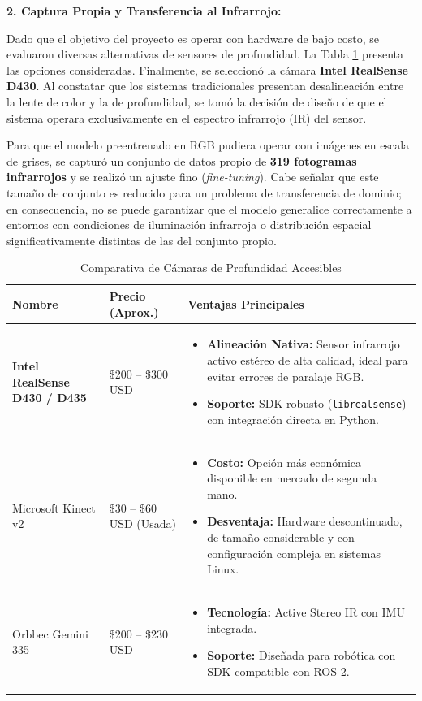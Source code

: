\documentclass[12pt, a4, twoside, openany]{report}
\begin{document}
\textbf{2. Captura Propia y Transferencia al Infrarrojo:}

Dado que el objetivo del proyecto es operar con hardware de bajo costo, se evaluaron diversas alternativas de sensores de profundidad. La Tabla \ref{tab:comparativa_camaras} presenta las opciones consideradas. Finalmente, se seleccionó la cámara \textbf{Intel RealSense D430}. Al constatar que los sistemas tradicionales presentan desalineación entre la lente de color y la de profundidad, se tomó la decisión de diseño de que el sistema operara exclusivamente en el espectro infrarrojo (IR) del sensor.

Para que el modelo preentrenado en RGB pudiera operar con imágenes en escala de grises, se capturó un conjunto de datos propio de \textbf{319 fotogramas infrarrojos} y se realizó un ajuste fino (\textit{fine-tuning}). Cabe señalar que este tamaño de conjunto es reducido para un problema de transferencia de dominio; en consecuencia, no se puede garantizar que el modelo generalice correctamente a entornos con condiciones de iluminación infrarroja o distribución espacial significativamente distintas de las del conjunto propio.

\begin{table}[H]
\centering
\caption{Comparativa de Cámaras de Profundidad Accesibles}
\label{tab:comparativa_camaras}
\begin{tabular}{l l p{7cm}}
\toprule
\textbf{Nombre} & \textbf{Precio (Aprox.)} & \textbf{Ventajas Principales} \\
\midrule
\textbf{Intel RealSense D430 / D435} & \$200 -- \$300 USD & 
\begin{itemize}[noitemsep, nolistsep, leftmargin=*]
    \item \textbf{Alineación Nativa:} Sensor infrarrojo activo estéreo de alta calidad, ideal para evitar errores de paralaje RGB.
    \item \textbf{Soporte:} SDK robusto (\texttt{librealsense}) con integración directa en Python.
\end{itemize} \\
\addlinespace
Microsoft Kinect v2 & \$30 -- \$60 USD (Usada) & 
\begin{itemize}[noitemsep, nolistsep, leftmargin=*]
    \item \textbf{Costo:} Opción más económica disponible en mercado de segunda mano.
    \item \textbf{Desventaja:} Hardware descontinuado, de tamaño considerable y con configuración compleja en sistemas Linux.
\end{itemize} \\
\addlinespace
Orbbec Gemini 335 & \$200 -- \$230 USD & 
\begin{itemize}[noitemsep, nolistsep, leftmargin=*]
    \item \textbf{Tecnología:} Active Stereo IR con IMU integrada.
    \item \textbf{Soporte:} Diseñada para robótica con SDK compatible con ROS 2.
\end{itemize} \\
\bottomrule
\end{tabular}
\end{table}
\end{document}

